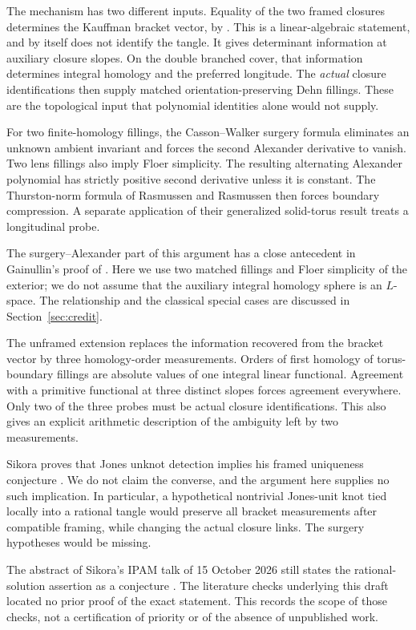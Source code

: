 \documentclass[11pt]{amsart}
\theoremstyle{definition}
\theoremstyle{remark}
\begin{document}
The mechanism has two different inputs. Equality of the two framed
closures determines the Kauffman bracket vector, by
\cite[Theorem~21]{Sikora}. This is a linear-algebraic statement, and by
itself does not identify the tangle. It gives determinant information
at auxiliary closure slopes. On the double branched cover, that
information determines integral homology and the preferred longitude.
The \emph{actual} closure identifications then supply matched
orientation-preserving Dehn fillings. These are the topological input
that polynomial identities alone would not supply.

For two finite-homology fillings, the Casson--Walker surgery formula
eliminates an unknown ambient invariant and forces the second
Alexander derivative to vanish. Two lens fillings also imply Floer
simplicity. The resulting alternating Alexander polynomial has
strictly positive second derivative unless it is constant.
The Thurston-norm formula of Rasmussen and Rasmussen then forces
boundary compression. A separate application of their generalized
solid-torus result treats a longitudinal probe.

The surgery--Alexander part of this argument has a close antecedent
in Gainullin's proof of \cite[Theorem~8.2]{Gainullin}. Here we use two
matched fillings and Floer simplicity of the exterior; we do not
assume that the auxiliary integral homology sphere is an \(L\)-space.
The relationship and the classical special cases are discussed in
Section~\ref{sec:credit}.

The unframed extension replaces the information recovered from the
bracket vector by three homology-order measurements. Orders of first
homology of torus-boundary fillings are absolute values of one
integral linear functional. Agreement with a primitive functional
at three distinct slopes forces agreement everywhere. Only two of
the three probes must be actual closure identifications. This also
gives an explicit arithmetic description of the ambiguity left by
two measurements.

Sikora proves that Jones unknot detection implies his framed
uniqueness conjecture \cite[Theorem~3]{Sikora}. We do not claim the
converse, and the argument here supplies no such implication.
In particular, a hypothetical nontrivial Jones-unit knot tied
locally into a rational tangle would preserve all bracket
measurements after compatible framing, while changing the actual
closure links. The surgery hypotheses would be missing.

The abstract of Sikora's IPAM talk of 15 October 2026 still states
the rational-solution assertion as a conjecture \cite{SikoraTalk}.
The literature checks underlying this draft located no prior proof
of the exact statement. This records the scope of those checks,
not a certification of priority or of the absence of unpublished work.
\end{document}
